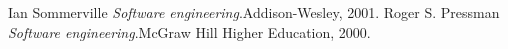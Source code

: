 \documentclass[letter]{article}
\begin{document}
\vspace{-12mm}
\renewcommand{\refname}{\section{Referências}}
  \begin{thebibliography}{2}  
\vspace{-5mm}
         Ian Sommerville  \newblock\emph{Software engineering}.\newblock Addison-Wesley, 2001. 
       Roger S. Pressman \newblock\emph{Software engineering}.\newblock McGraw Hill Higher Education, 2000.
  \end{thebibliography}  
\end{document}
